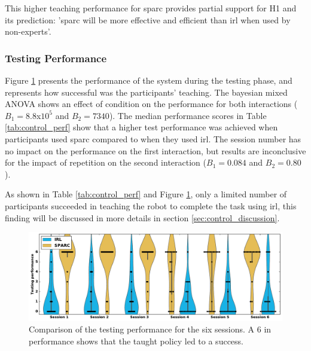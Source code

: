 This higher teaching performance for \gls{sparc} provides partial support for H1 and its prediction: '\gls{sparc} will be more effective and efficient than \gls{irl} when used by non-experts'.

\subsubsection{Testing Performance}

Figure \ref{fig:control_perf} presents the performance of the system during the testing phase, and represents how successful was the participants' teaching. The bayesian mixed ANOVA shows an effect of condition on the performance for both interactions ($B_1=8.8$x$10^5$ and $B_2 = 7340$). The median performance scores in Table \ref{tab:control_perf} show that a higher test performance was achieved when participants used \gls{sparc} compared to when they used \gls{irl}. The session number has no impact on the performance on the first interaction, but results are inconclusive for the impact of repetition on the second interaction ($B_1=0.084$ and $B_2=0.80$).


As shown in Table \ref{tab:control_perf} and Figure \ref{fig:control_perf}, only a limited number of participants succeeded in teaching the robot to complete the task using \gls{irl}, this finding will be discussed in more details in section \ref{sec:control_discussion}.


\begin{figure}[ht]
	\includegraphics[width=\textwidth]{performance.pdf}
	\centering
	\caption{Comparison of the testing performance for the six sessions. A 6 in performance shows that the taught policy led to a success.
	}
	\label{fig:control_perf}
\end{figure}

